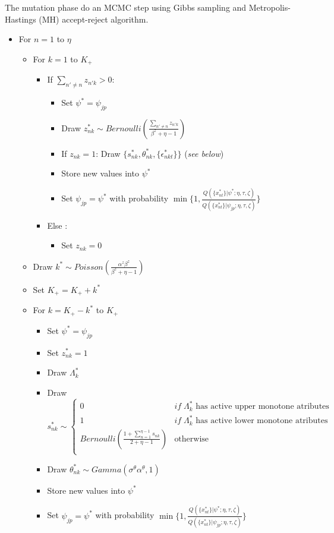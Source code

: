 \documentclass[12pt]{article}
\newcounter{thm}[section]
\begin{document}
The mutation phase do an MCMC step using Gibbs sampling and Metropolis-Hastings (MH) accept-reject algorithm.

\begin{itemize}
	\item For $n=1$ to $\eta$
	\begin{itemize}
		\item For $k=1$ to $K_+$
		\begin{itemize}
			\item If $\sum_{n' \neq n} z_{n'k} > 0 $:
			\begin{itemize}
				\item Set $\psi^* = \psi_{jp}$
				\item Draw $z^*_{nk} \sim Bernoulli(\frac{\sum_{n' \neq n} z_{n'k}}{\beta^z + \eta - 1})$
				\item If $z_{nk} = 1$: Draw $\{s^*_{nk},\theta^*_{nk},\{\epsilon^*_{nkt}\}\}$ (\textit{see below})
				\item Store new values into $\psi^*$
				\item Set $\psi_{jp} = \psi^*$ with probability $\min\{1, \frac{ Q(\{x_{nt}^*\}|\psi^*;\eta,\tau,\zeta) }{ Q(\{x_{nt}^*\}|\psi_{jp};\eta,\tau,\zeta)} \}$
			\end{itemize}
			\item Else :
			\begin{itemize}
				\item Set $z_{nk}=0$
			\end{itemize}
		\end{itemize}
		\item Draw $k^* \sim Poisson(\frac{\alpha^z \beta^z}{\beta^z + \eta - 1})$
		\item Set $K_+ = K_+ + k^*$
		\item For $k=K_+ - k^*$ to $K_+$
		\begin{itemize}
			\item Set $\psi^* = \psi_{jp}$
			\item Set $z^*_{n k} = 1$
			\item Draw $\Lambda^*_k$
			\item Draw $s^*_{n k} \sim \left\{ \begin{array}{cl}
			0 & if \; \Lambda^*_k \text{ has active upper monotone atributes}\\
			1 & if \; \Lambda^*_k \text{ has active lower monotone atributes}\\
			Bernoulli(\frac{1 + \sum_{n=1}^{\eta-1} s_{nk}}{2+\eta-1}) & \text{otherwise}\\
			\end{array}\right.$
			\item Draw $\theta^*_{n k} \sim Gamma(\sigma^\theta \alpha^\theta,1)$
			\item Store new values into $\psi^*$
			\item Set $\psi_{jp} = \psi^*$ with probability $\min\{1, \frac{ Q(\{x_{nt}^*\}|\psi^*;\eta,\tau,\zeta) }{ Q(\{x_{nt}^*\}|\psi_{jp};\eta,\tau,\zeta)} \}$
		\end{itemize}
	\end{itemize}
	

\end{itemize}
\end{document}
